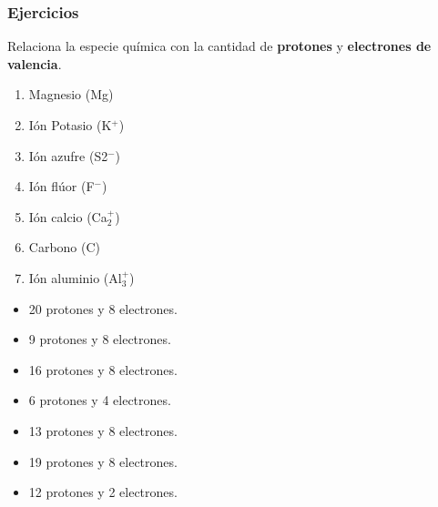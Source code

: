\documentclass[11pt]{book}
\begin{document}
\subsubsection{Ejercicios}
\begin{boxK}
  Relaciona la especie química con la cantidad de \textbf{protones} y \textbf{electrones de valencia}.\\

  \begin{minipage}{0.5\textwidth}
    \begin{enumerate}
      \item Magnesio (Mg)
      \item I\'on Potasio (K$^+$)
      \item Ión azufre (S2$^-$)
      \item Ión flúor (F$^-$)
      \item Ión calcio (Ca$_2^+$)
      \item Carbono (C)
      \item Ión aluminio (Al$_3^+$)
    \end{enumerate}
  \end{minipage}%
  \begin{minipage}{0.5\textwidth}
    \begin{itemize}
      \item[\rule{1cm}{0.2mm}] 20 protones y 8 electrones.
      \item[\rule{1cm}{0.2mm}] 9 protones y 8 electrones.
      \item[\rule{1cm}{0.2mm}] 16 protones y 8 electrones.
      \item[\rule{1cm}{0.2mm}] 6 protones y 4 electrones.
      \item[\rule{1cm}{0.2mm}] 13 protones y 8 electrones.
      \item[\rule{1cm}{0.2mm}] 19 protones y 8 electrones.
      \item[\rule{1cm}{0.2mm}] 12 protones y 2 electrones.
    \end{itemize}
  \end{minipage}

\end{boxK}
\end{document}
